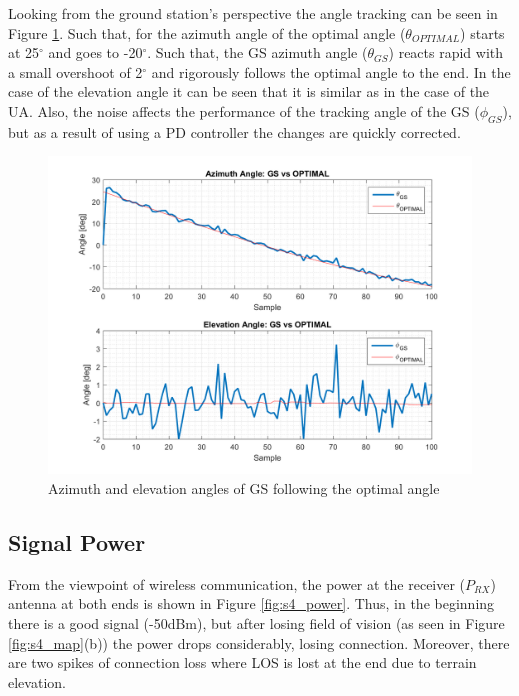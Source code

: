 Looking from the ground station's perspective the angle tracking can be seen in Figure \ref{fig:s4_gs}. Such that, for the azimuth angle of the optimal angle ($\theta_{OPTIMAL}$) starts at 25$^{\circ}$ and goes to -20$^{\circ}$. Such that, the GS azimuth angle ($\theta_{GS}$) reacts rapid with a small overshoot of 2$^{\circ}$ and rigorously follows the optimal angle to the end. In the case of the elevation angle it can be seen that it is similar as in the case of the UA. Also, the noise affects the performance of the tracking angle of the GS ($\phi_{GS}$), but as a result of using a PD controller the changes are quickly corrected.

\begin{figure}[H]
	\centering
	\includegraphics[scale=0.8]{figures/s4_gs.png}
	\caption{Azimuth and elevation angles of GS following the optimal angle}
	\label{fig:s4_gs}
\end{figure}

\subsection*{Signal Power}
From the viewpoint of wireless communication, the power at the receiver ($P_{RX}$) antenna at both ends is shown in Figure \ref{fig:s4_power}. Thus, in the beginning there is a good signal (-50dBm), but after losing field of vision (as seen in Figure \ref{fig:s4_map}(b)) the power drops considerably, losing connection. Moreover, there are two spikes of connection loss where LOS is lost at the end due to terrain elevation.


